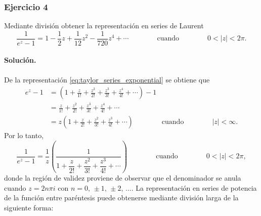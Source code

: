 \documentclass[a4paper]{report}
\begin{document}
\subsubsection*{Ejercicio 4}

Mediante división obtener la representación en series de Laurent
\[
 \frac{1}{e^z-1}=1-\frac{1}{2}z+\frac{1}{12}z^2-\frac{1}{720}z^4+\cdots
  \qquad\qquad\textrm{cuando}\qquad\qquad
  0<|z|<2\pi.
\]

\paragraph{Solución.} De la representación \ref{eq:taylor_series_exponential} se obtiene que 
\begin{align*}
 e^z-1&=\left(1+\frac{z}{1!}+\frac{z^2}{2!}+\frac{z^3}{3!}+\frac{z^4}{4!}+\cdots\right)-1\\
  &=\frac{z}{1!}+\frac{z^2}{2!}+\frac{z^3}{3!}+\frac{z^4}{4!}+\cdots\\
  &=z\left(1+\frac{z}{2!}+\frac{z^2}{3!}+\frac{z^3}{4!}+\cdots\right)
 \qquad\qquad\textrm{cuando}\qquad\qquad
 |z|<\infty. 
\end{align*}
Por lo tanto,
\begin{equation}\label{eq:exercise_73_04}
 \frac{1}{e^z-1}=\frac{1}{z}\left(\dfrac{1}{1+\dfrac{z}{2!}+\dfrac{z^2}{3!}+\dfrac{z^3}{4!}+\cdots}\right)
 \qquad\qquad\textrm{cuando}\qquad\qquad
 0<|z|<2\pi, 
\end{equation}
donde la región de validez proviene de observar que el denominador se anula cuando \(z=2n\pi i\) con \(n=0,\,\pm1,\,\pm2,\,\dots\). La representación en series de potencia de la función entre paréntesis puede obtenerse mediante división larga de la siguiente forma:
\end{document}
